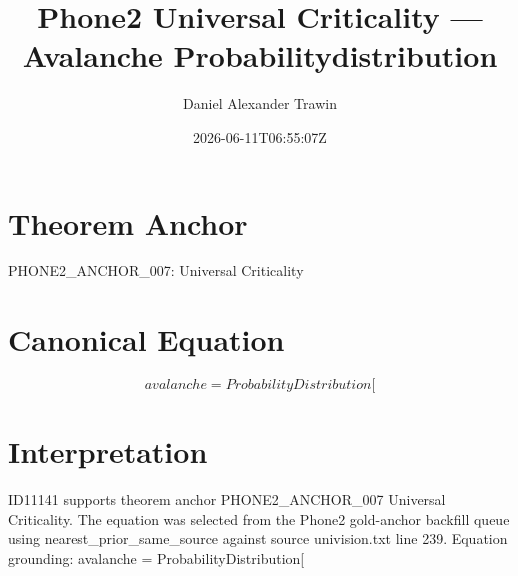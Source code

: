 \documentclass[11pt]{article}
\title{Phone2 Universal Criticality — Avalanche Probabilitydistribution}
\author{Daniel Alexander Trawin}
\date{2026-06-11T06:55:07Z}
\begin{document}
\maketitle
\section*{Theorem Anchor}
PHONE2_ANCHOR_007: Universal Criticality
\section*{Canonical Equation}
\[
avalanche = ProbabilityDistribution[
\]
\section*{Interpretation}
ID11141 supports theorem anchor PHONE2_ANCHOR_007 Universal Criticality. The equation was selected from the Phone2 gold-anchor backfill queue using nearest_prior_same_source against source univision.txt line 239. Equation grounding: avalanche = ProbabilityDistribution[
\end{document}
